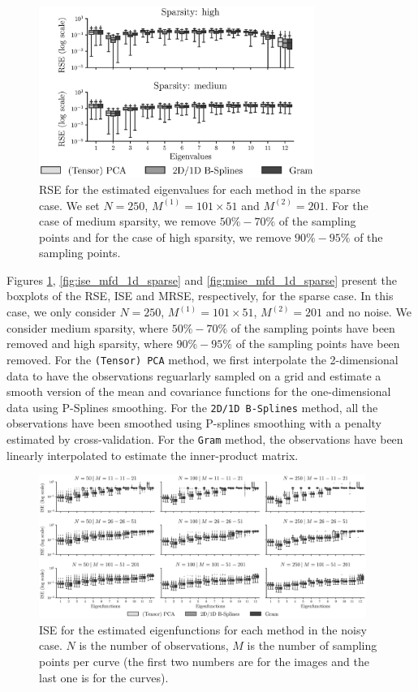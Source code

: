 \begin{figure}
    \centering
    \includegraphics[width=0.8\textwidth]{figures/AE_sparse.eps}
    \caption{RSE for the estimated eigenvalues for each method in the sparse case. We set $N = 250$, $M^{(1)} = 101 \times 51$ and $M^{(2)} = 201$. For the case of medium sparsity, we remove $50\%-70\%$ of the sampling points and for the case of high sparsity, we remove $90\%-95\%$ of the sampling points.}
    \label{fig:logAE_mfd_1d_sparse}
\end{figure}


Figures \ref{fig:logAE_mfd_1d_sparse}, \ref{fig:ise_mfd_1d_sparse} and \ref{fig:mise_mfd_1d_sparse} present the boxplots of the RSE, ISE and MRSE, respectively, for the sparse case. In this case, we only consider $N = 250$, $M^{(1)} = 101 \times 51$, $M^{(2)} = 201$ and no noise. We consider medium sparsity, where $50\%-70\%$ of the sampling points have been removed and high sparsity, where $90\%-95\%$ of the sampling points have been removed. For the \texttt{(Tensor) PCA} method, we first interpolate the 2-dimensional data to have the observations reguarlarly sampled on a grid and estimate a smooth version of the mean and covariance functions for the one-dimensional data using P-Splines smoothing. For the \texttt{2D/1D B-Splines} method, all the observations have been smoothed using P-splines smoothing with a penalty estimated by cross-validation. For the \texttt{Gram} method, the observations have been linearly interpolated to estimate the inner-product matrix.



\begin{figure}
     \centering
    \includegraphics[width=0.95\textwidth]{figures/ISE_noise.eps}
    \caption{ISE for the estimated eigenfunctions for each method in the noisy case. $N$ is the number of observations, $M$ is the number of sampling points per curve (the first two numbers are for the images and the last one is for the curves).}
    \label{fig:ise_mfd_1d_noise}
\end{figure}

